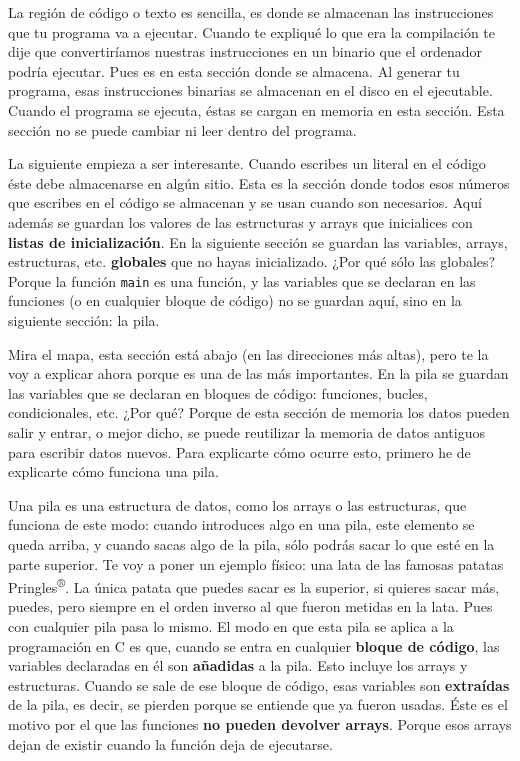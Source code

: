 \documentclass[a4paper]{article}
\begin{document}
La región de código o texto es sencilla, es donde se almacenan las
instrucciones que tu programa va a ejecutar. Cuando te expliqué lo que era la
compilación te dije que convertiríamos nuestras instrucciones en un binario que
el ordenador podría ejecutar. Pues es en esta sección donde se almacena. Al
generar tu programa, esas instrucciones binarias se almacenan en el disco en
el ejecutable. Cuando el programa se ejecuta, éstas se cargan en memoria en
esta sección. Esta sección no se puede cambiar ni leer dentro del programa.

La siguiente empieza a ser interesante. Cuando escribes un literal en el código
éste debe almacenarse en algún sitio. Esta es la sección donde todos esos
números que escribes en el código se almacenan y se usan cuando son necesarios.
Aquí además se guardan los valores de las estructuras y arrays que inicialices
con \textbf{listas de inicialización}. En la siguiente sección se guardan las
variables, arrays, estructuras, etc. \textbf{globales} que no hayas
inicializado. ¿Por qué sólo las globales? Porque la función \verb!main! es una
función, y las variables que se declaran en las funciones
(o en cualquier bloque de código) no se guardan aquí, sino en la siguiente
sección: la pila.

Mira el mapa, esta sección está abajo (en las direcciones más altas), pero
te la voy a explicar ahora porque es una de las más importantes. En la pila
se guardan las variables que se declaran en bloques de código: funciones,
bucles, condicionales, etc. ¿Por qué? Porque de esta sección de memoria los
datos pueden salir y entrar, o mejor dicho, se puede reutilizar la memoria
de datos antiguos para escribir datos nuevos. Para explicarte cómo ocurre esto,
primero he de explicarte cómo funciona una pila.

Una pila es una estructura de datos, como los arrays o las estructuras, que
funciona de este modo: cuando introduces algo en una pila, este elemento se
queda arriba, y cuando sacas algo de la pila, sólo podrás sacar lo que esté
en la parte superior. Te voy a poner un ejemplo físico: una lata de las famosas
patatas Pringles\textsuperscript{®}. La única patata que puedes sacar es la
superior, si quieres sacar más, puedes, pero siempre en el orden inverso al que
fueron metidas en la lata. Pues con cualquier pila pasa lo mismo.
El modo en que esta pila se aplica a la programación en C es que,
cuando se entra en cualquier
\textbf{bloque de código}, las variables declaradas en él son \textbf{añadidas}
a la pila. Esto incluye los arrays y estructuras. Cuando se sale de ese bloque
de código, esas variables son \textbf{extraídas} de la pila, es decir,
se pierden porque se entiende que ya fueron usadas. Éste es el motivo por el
que las funciones \textbf{no pueden devolver arrays}. Porque esos arrays
dejan de existir cuando la función deja de ejecutarse.
\end{document}
